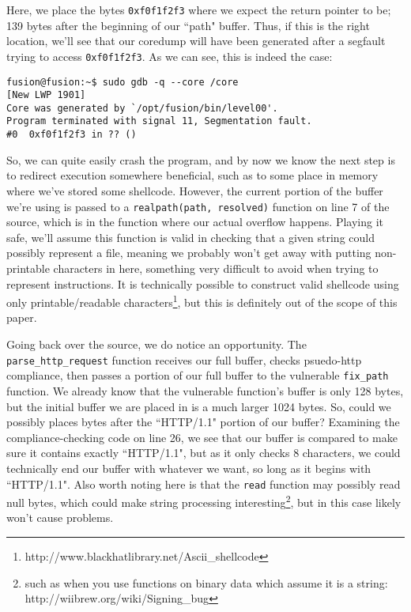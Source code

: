 Here, we place the bytes \texttt{0xf0f1f2f3} where we expect the return pointer to be;
139 bytes after the beginning of our ``path" buffer. Thus, if this
is the right location, we'll see that our coredump will have been
generated after a segfault trying to access \texttt{0xf0f1f2f3}.
As we can see, this is indeed the case:

\begin{lstlisting}
fusion@fusion:~$ sudo gdb -q --core /core
[New LWP 1901]
Core was generated by `/opt/fusion/bin/level00'.
Program terminated with signal 11, Segmentation fault.
#0  0xf0f1f2f3 in ?? ()
\end{lstlisting}

So, we can quite easily crash the program, and by now we know the
next step is to redirect execution somewhere beneficial, such as
to some place in memory where we've stored some shellcode. However, 
the current portion of the buffer we're using is passed to
a \texttt{realpath(path, resolved)} function on line 7 of 
the source, which is in the function where our actual overflow happens. Playing
it safe, we'll assume this function is valid in checking that a
given string could possibly represent a file, meaning we probably
won't get away with putting non-printable characters in here, 
something very difficult to avoid when trying to represent instructions.
It is technically possible to construct valid shellcode using
only printable/readable characters\footnote{http://www.blackhatlibrary.net/Ascii\_shellcode},
but this is definitely out of the scope of this paper.

Going back over the source, we do notice an opportunity. The
\texttt{parse\_http\_request} function receives our full buffer,
checks psuedo-http compliance, then passes a portion of our
full buffer to the vulnerable \texttt{fix\_path} function. We 
already know that the vulnerable function's buffer is only
128 bytes, but the initial buffer we are placed in is a much
larger 1024 bytes. So, could we possibly places bytes after
the ``HTTP/1.1" portion of our buffer? Examining the compliance-checking
code on line 26, we see that our buffer is compared to make
sure it contains exactly ``HTTP/1.1", but as it only checks
8 characters, we could technically end our buffer with whatever
we want, so long as it begins with ``HTTP/1.1". Also worth noting
here is that the \texttt{read} function may
possibly read null bytes, which could make string processing 
interesting\footnote{such as when you use functions on binary data which assume it is a string: http://wiibrew.org/wiki/Signing\_bug},
but in this case likely won't cause problems.

